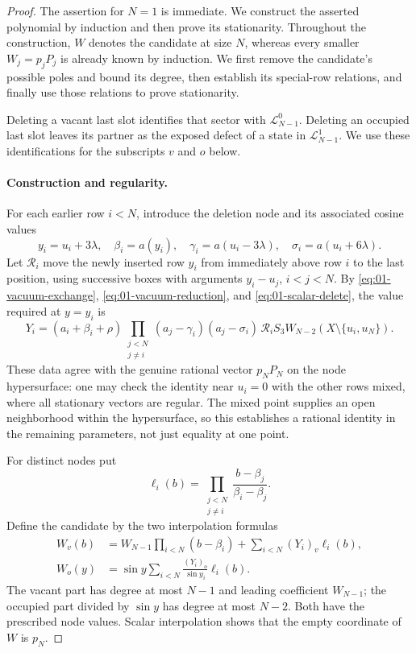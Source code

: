 \begin{proof}
The assertion for $N=1$ is immediate. We construct the asserted
polynomial by induction and then prove its stationarity. Throughout the
construction, $W$ denotes the candidate at size $N$, whereas every
smaller $W_j=p_jP_j$ is already known by induction. We first remove
the candidate's possible poles and bound its degree, then establish
its special-row relations, and finally use those relations to prove
stationarity.

Deleting a vacant last slot identifies that sector with
$\mathcal L_{N-1}^0$. Deleting an occupied last slot leaves its partner
as the exposed defect of a state in $\mathcal L_{N-1}^1$. We use these
identifications for the subscripts $v$ and $o$ below.

\paragraph{Construction and regularity.}

For each earlier row $i<N$, introduce the deletion node and its
associated cosine values
\[
 y_i=u_i+3\lambda,\quad \beta_i=a(y_i),\quad
 \gamma_i=a(u_i-3\lambda),\quad \sigma_i=a(u_i+6\lambda).
\]
Let $\mathcal R_i$ move the newly inserted row $y_i$ from immediately
above row $i$ to the last position, using successive boxes with
arguments $y_i-u_j$, $i<j<N$. By
\eqref{eq:01-vacuum-exchange}, \eqref{eq:01-vacuum-reduction}, and
\eqref{eq:01-scalar-delete}, the value required at $y=y_i$ is
\begin{equation}\label{eq:01-interpolation-data}
 Y_i=(a_i+\beta_i+\rho)
       \prod_{\substack{j<N\\j\ne i}}
           (a_j-\gamma_i)(a_j-\sigma_i)\,
       \mathcal R_i S_3W_{N-2}(X\setminus\{u_i,u_N\}).
\end{equation}
These data agree with the genuine rational vector $p_NP_N$ on the
node hypersurface: one may check the identity near $u_i=0$ with the
other rows mixed, where all stationary vectors are regular. The mixed point supplies an
open neighborhood within the hypersurface, so this establishes a rational
identity in the remaining parameters, not just equality at one point.

For distinct nodes put
\[
 \ell_i(b)=\prod_{\substack{j<N\\j\ne i}}
                 \frac{b-\beta_j}{\beta_i-\beta_j}.
\]
Define the candidate by the two interpolation formulas
\begin{equation}\label{eq:vacuum-interpolants}
 \begin{aligned}
 W_v(b)&=W_{N-1}\prod_{i<N}(b-\beta_i)
                 +\sum_{i<N}(Y_i)_v\ell_i(b),\\
 W_o(y)&=\sin y\sum_{i<N}\frac{(Y_i)_o}{\sin y_i}\ell_i(b).
 \end{aligned}
\end{equation}
The vacant part has degree at most $N-1$ and leading coefficient
$W_{N-1}$; the occupied part divided by $\sin y$ has degree at most
$N-2$. Both have the prescribed node values. Scalar interpolation
shows that the empty coordinate of $W$ is $p_N$.


\end{proof}
